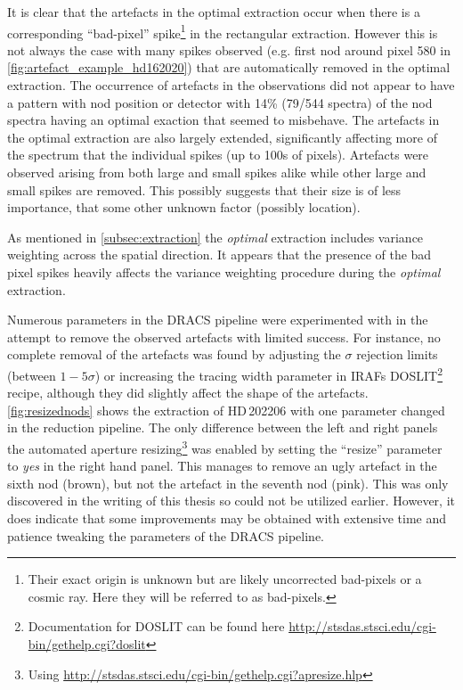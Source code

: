 It is clear that the artefacts in the optimal extraction occur when there is a corresponding ``bad-pixel'' spike\footnote{Their exact origin is unknown but are likely uncorrected bad-pixels or a cosmic ray.
Here they will be referred to as bad-pixels.} in the rectangular extraction.
However this is not always the case with many spikes observed (e.g. first nod around pixel 580 in \cref{fig:artefact_example_hd162020}) that are automatically removed in the optimal extraction.
The occurrence of artefacts in the observations did not appear to have a pattern with nod position or detector with 14\% (79/544 spectra) of the nod spectra having an optimal exaction that seemed to misbehave.
The artefacts in the optimal extraction are also largely extended, significantly affecting more of the spectrum that the individual spikes (up to 100s of pixels).
Artefacts were observed arising from both large and small spikes alike while other large and small spikes are removed.
This possibly suggests that their size is of less importance, that some other unknown factor (possibly location).

As mentioned in \cref{subsec:extraction} the \emph{optimal} extraction includes variance weighting across the spatial direction.
It appears that the presence of the bad pixel spikes heavily affects the variance weighting procedure during the \emph{optimal} extraction.

Numerous parameters in the {DRACS} pipeline were experimented with in the attempt to remove the observed artefacts with limited success.
For instance, no complete removal of the artefacts was found by adjusting the \(\sigma\) rejection limits (between \(1-5 \sigma\)) or  increasing the tracing width parameter in {IRAF}s DOSLIT\footnote{Documentation for DOSLIT can be found here \href{http://stsdas.stsci.edu/cgi-bin/gethelp.cgi?doslit}{http://stsdas.stsci.edu/cgi-bin/gethelp.cgi?doslit}} recipe, although they did slightly affect the shape of the artefacts.
\cref{fig:resizednods} shows the extraction of HD\,202206 with one parameter changed in the reduction pipeline.
The only difference between the left and right panels the automated aperture resizing\footnote{Using \href{apresize}{http://stsdas.stsci.edu/cgi-bin/gethelp.cgi?apresize.hlp}} was enabled by setting the ``resize'' parameter to \emph{yes} in the right hand panel.
This manages to remove an ugly artefact in the sixth nod (brown), but not the artefact in the seventh nod (pink).
This was only discovered in the writing of this thesis so could not be utilized earlier.
However, it does indicate that some improvements may be obtained with extensive time and patience tweaking the parameters of the {DRACS} pipeline.

